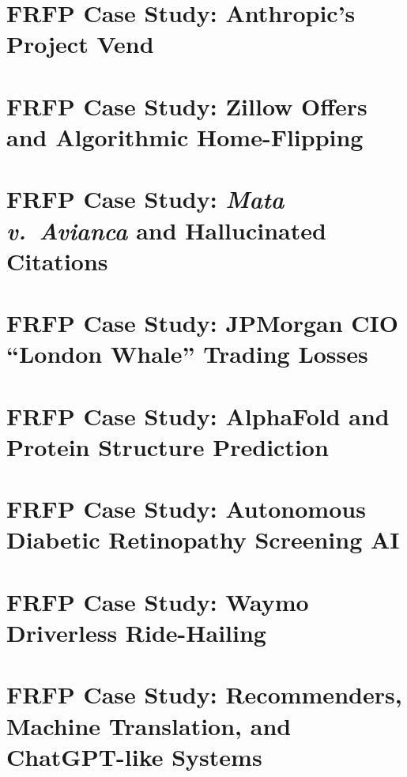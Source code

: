\documentclass[11pt,oneside]{book}
\begin{document}
\chapter{FRFP Case Study: Anthropic's Project Vend}
\label{ch:cs-vend}


\chapter{FRFP Case Study: Zillow Offers and Algorithmic Home-Flipping}
\label{ch:cs-zillow-offers}


\chapter{FRFP Case Study: \emph{Mata v.\ Avianca} and Hallucinated Citations}
\label{ch:cs-mata-avianca}


\chapter{FRFP Case Study: JPMorgan CIO ``London Whale'' Trading Losses}
\label{ch:cs-london-whale}



\chapter{FRFP Case Study: AlphaFold and Protein Structure Prediction}
\label{ch:cs-alphafold}


\chapter{FRFP Case Study: Autonomous Diabetic Retinopathy Screening AI}
\label{ch:cs-dr-screening}


\chapter{FRFP Case Study: Waymo Driverless Ride-Hailing}
\label{ch:cs-waymo}



\chapter{FRFP Case Study: Recommenders, Machine Translation, and ChatGPT-like Systems}
\label{ch:cs-platform-systems}

\end{document}
